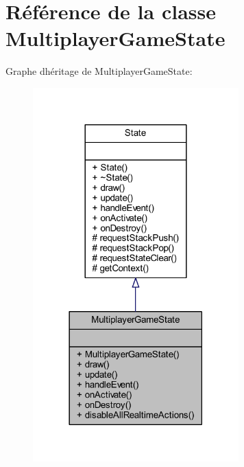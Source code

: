 \hypertarget{class_multiplayer_game_state}{}\section{Référence de la classe Multiplayer\+Game\+State}
\label{class_multiplayer_game_state}


Graphe d\textquotesingle{}héritage de Multiplayer\+Game\+State\+:\nopagebreak
\begin{figure}[H]
\begin{center}
\leavevmode
\includegraphics[width=225pt]{class_multiplayer_game_state__inherit__graph}
\end{center}
\end{figure}


